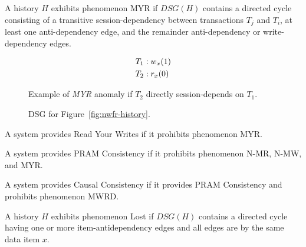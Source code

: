 \begin{definition}
A history $H$ exhibits phenomenon MYR if $DSG(H)$ contains a directed cycle
consisting of a transitive session-dependency between transactions
$T_j$ and $T_i$, at least one anti-dependency edge, and the remainder
anti-dependency or write-dependency edges.
\end{definition}


\begin{figure}[H]
\begin{align*}
\small
T_1 &: w_x(1)\\
T_2 &: r_x(0)\\
\end{align*}
\caption{Example of \textit{MYR} anomaly if $T_2$ directly session-depends on $T_1$.}
\label{fig:nryw-history}
\end{figure}

\begin{figure}[H]
\centering
{}
\caption{DSG for Figure~\ref{fig:nwfr-history}.}
\label{fig:nryw-dsg}
\end{figure}

\begin{definition}
A system provides Read Your Writes if it prohibits phenomenon MYR.
\end{definition}

\begin{definition}
A system provides PRAM Consistency if it prohibits phenomenon N-MR,
N-MW, and MYR.
\end{definition}

\begin{definition}
A system provides Causal Consistency if it provides PRAM Consistency
and prohibits phenomenon MWRD.
\end{definition}

\begin{definition}
A history $H$ exhibits phenomenon Lost if $DSG(H)$ contains a directed
cycle having one or more item-antidependency edges and all edges are
by the same data item $x$.
\label{def:lostupdate}
\end{definition}

